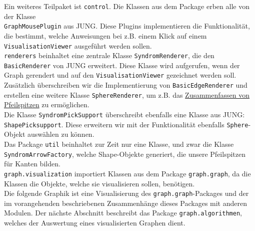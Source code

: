 \documentclass[enabledeprecatedfontcommands,fontsize=11pt,paper=a4,twoside]{scrartcl}
\begin{document}
	Ein weiteres Teilpaket ist \texttt{control}. Die Klassen aus dem Package erben alle von der Klasse \\ \texttt{GraphMousePlugin} aus JUNG. Diese Plugins implementieren die Funktionalität, die bestimmt, welche Anweisungen bei z.B. einem Klick auf einem \texttt{VisualisationViewer} ausgeführt werden sollen. \\
	
	\texttt{renderers} beinhaltet eine zentrale Klasse \texttt{SyndromRenderer}, die den \texttt{BasicRenderer} von JUNG erweitert. Diese Klasse wird aufgerufen, wenn der Graph gerendert und auf den \texttt{VisualisationViewer} gezeichnet werden soll. Zusätzlich überschreiben wir die Implementierung von \texttt{BasicEdgeRenderer} und erstellen eine weitere Klasse \texttt{SphereRenderer}, um z.B. das \hyperlink{cc}{Zusammenfassen von Pfeilspitzen} zu ermöglichen. \\
	
	Die Klasse \texttt{SyndromPickSupport} überschreibt ebenfalls eine Klasse aus JUNG: \texttt{ShapePicksupport}. Diese erweitern wir mit der Funktionalität ebenfalls \texttt{Sphere}-Objekt auswählen zu können. \\ 
	
	Das Package \texttt{util} beinhaltet zur Zeit nur eine Klasse, und zwar die Klasse \texttt{SyndromArrowFactory}, welche Shape-Objekte generiert, die unsere Pfeilspitzen für Kanten bilden. \\
	
	\texttt{graph.visualization} importiert Klassen aus dem Package \texttt{graph.graph}, da die Klassen die Objekte, welche sie visualisieren sollen, benötigen. \\
	
	Die folgende Graphik ist eine Visualisierung des \texttt{graph.graph}-Packages und der im vorangehenden beschriebenen Zusammenhänge dieses Packages mit anderen Modulen. Der nächste Abschnitt beschreibt das Package \texttt{graph.algorithmen}, welches der Auswertung eines visualisierten Graphen dient.
	
	
	
\end{document}
